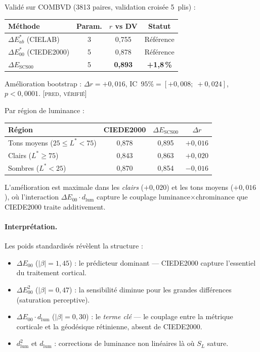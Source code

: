 \documentclass[12pt,a4paper]{article}
\begin{document}
\begin{predictionbox}
Valid\'e sur COMBVD (3813 paires, validation crois\'ee 5~plis) :
\begin{center}
\begin{tabular}{lccc}
\toprule
M\'ethode & Param. & $r$ vs DV & Statut \\
\midrule
$\Delta E^*_{ab}$ (CIELAB) & 3 & 0{,}755 & R\'ef\'erence \\
$\Delta E^*_{00}$ (CIEDE2000) & 5 & 0{,}878 & R\'ef\'erence \\
$\Delta E_{\mathrm{SCS00}}$ & 5 & \textbf{0{,}893} & \textbf{+1{,}8\,\%} \\
\bottomrule
\end{tabular}
\end{center}
Am\'elioration bootstrap : $\Delta r = +0{,}016$,
IC~$95\% = [+0{,}008;\; +0{,}024]$, $p < 0{,}0001$.
\textsc{[pred, v\'erifi\'e]}

\medskip
Par r\'egion de luminance :
\begin{center}
\begin{tabular}{lccc}
\toprule
R\'egion & CIEDE2000 & $\Delta E_{\mathrm{SCS00}}$ & $\Delta r$ \\
\midrule
Tons moyens ($25 \leq L^* < 75$) & 0{,}878 & 0{,}895 & $+0{,}016$ \\
Clairs ($L^* \geq 75$) & 0{,}843 & 0{,}863 & $+0{,}020$ \\
Sombres ($L^* < 25$) & 0{,}870 & 0{,}854 & $-0{,}016$ \\
\bottomrule
\end{tabular}
\end{center}
L'am\'elioration est maximale dans les \emph{clairs} ($+0{,}020$) et
les tons moyens ($+0{,}016$), o\`u l'interaction
$\Delta E_{00} \cdot d_{\mathrm{lum}}$ capture le couplage
luminance$\times$chrominance que CIEDE2000 traite additivement.
\end{predictionbox}

\paragraph{Interpr\'etation.}
Les poids standardis\'es r\'ev\`elent la structure :
\begin{itemize}[nosep]
\item $\Delta E_{00}$ ($|\beta| = 1{,}45$) : le pr\'edicteur dominant
  --- CIEDE2000 capture l'essentiel du traitement cortical.
\item $\Delta E_{00}^2$ ($|\beta| = 0{,}47$) : la sensibilit\'e
  diminue pour les grandes diff\'erences (saturation perceptive).
\item $\Delta E_{00} \cdot d_{\mathrm{lum}}$ ($|\beta| = 0{,}30$) :
  le \emph{terme cl\'e} --- le couplage entre la m\'etrique corticale
  et la g\'eod\'esique r\'etinienne, absent de CIEDE2000.
\item $d_{\mathrm{lum}}^2$ et $d_{\mathrm{lum}}$ : corrections de
  luminance non lin\'eaires l\`a o\`u $S_L$ sature.
\end{itemize}
\end{document}
